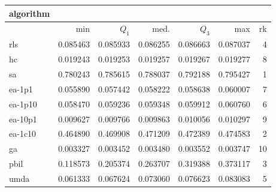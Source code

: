 \begin{tabular}{@{}l*{5}{>{{}}N{1}{3}}>{{}}N{2}{0}@{}}
\toprule
{algorithm} &  \\
\midrule
& {min} & {$Q_1$} & {med.} & {$Q_3$} & {max} & {rk}\\
\midrule
rls & 0.085463 & 0.085933 & 0.086255 & 0.086663 & 0.087037 & 4\\
hc & 0.019243 & 0.019253 & 0.019257 & 0.019267 & 0.019277 & 8\\
sa & {\color{blue}} 0.780243 & {\color{blue}} 0.785615 & {\color{blue}} 0.788037 & {\color{blue}} 0.792188 & {\color{blue}} 0.795427 & 1\\
ea-1p1 & 0.055890 & 0.057442 & 0.058222 & 0.058638 & 0.060007 & 7\\
ea-1p10 & 0.058470 & 0.059236 & 0.059348 & 0.059912 & 0.060760 & 6\\
ea-10p1 & 0.009627 & 0.009766 & 0.009863 & 0.010056 & 0.010297 & 9\\
ea-1c10 & 0.464890 & 0.469908 & 0.471209 & 0.472389 & 0.474583 & 2\\
ga & 0.003327 & 0.003452 & 0.003480 & 0.003552 & 0.003747 & 10\\
pbil & 0.118573 & 0.205374 & 0.263707 & 0.319388 & 0.373117 & 3\\
umda & 0.061333 & 0.067624 & 0.073060 & 0.076623 & 0.083083 & 5\\
\bottomrule
\end{tabular}
